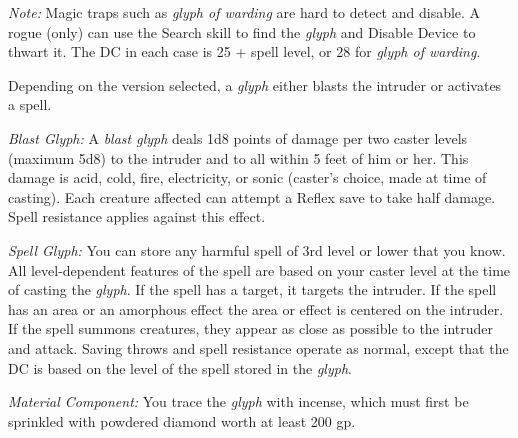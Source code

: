 \textit{Note:} Magic traps such as \textit{glyph of warding} are hard to detect 
and disable. A rogue (only) can use the Search skill to find the \textit{glyph 
}and Disable Device to thwart it. The DC in each case is 25 + spell level, or 28 
for \textit{glyph of warding}.

Depending on the version selected, a \textit{glyph} either blasts the intruder 
or activates a spell.

\textit{Blast Glyph:} A \textit{blast glyph} deals 1d8 points of damage per two 
caster levels (maximum 5d8) to the intruder and to all within 5 feet of him or 
her. This damage is acid, cold, fire, electricity, or sonic (caster's choice, made 
at time of casting). Each creature affected can attempt a Reflex save to take half 
damage. Spell resistance applies against this effect.

\textit{Spell Glyph:} You can store any harmful spell of 3rd level or lower that 
you know. All level-dependent features of the spell are based on your caster level 
at the time of casting the \textit{glyph}. If the spell has a target, it targets 
the intruder. If the spell has an area or an amorphous effect the area or effect 
is centered on the intruder. If the spell summons creatures, they appear as close 
as possible to the intruder and attack. Saving throws and spell resistance operate 
as normal, except that the DC is based on the level of the spell stored in the 
\textit{glyph}.

\textit{Material Component:} You trace the \textit{glyph} with incense, which must 
first be sprinkled with powdered diamond worth at least 200 gp.

